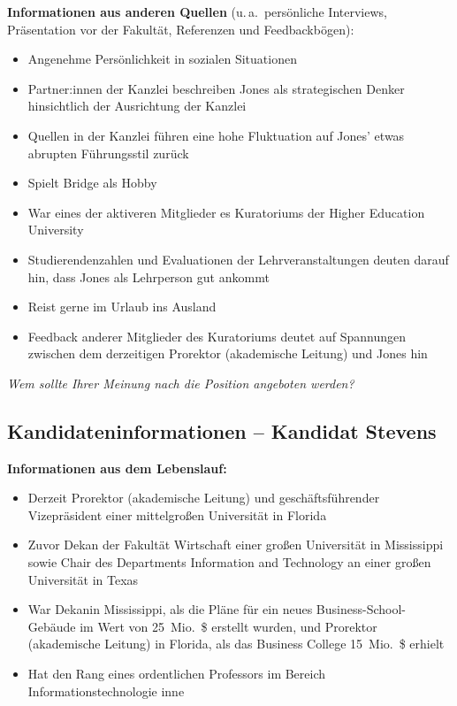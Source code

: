 \textbf{Informationen aus anderen Quellen}
(u.\,a.\ persönliche Interviews, Präsentation vor der Fakultät, Referenzen und Feedbackbögen):
\begin{itemize}
  \item Angenehme Persönlichkeit in sozialen Situationen
  \item Partner:innen der Kanzlei beschreiben Jones als strategischen Denker hinsichtlich der Ausrichtung
    der Kanzlei
  \item Quellen in der Kanzlei führen eine hohe Fluktuation auf Jones' etwas abrupten Führungsstil zurück
  \item Spielt Bridge als Hobby
  \item War eines der aktiveren Mitglieder es Kuratoriums der Higher Education
    University
  \item Studierendenzahlen und Evaluationen der Lehrveranstaltungen deuten darauf hin, dass Jones als
    Lehrperson gut ankommt
  \item Reist gerne im Urlaub ins Ausland
  \item Feedback anderer Mitglieder des Kuratoriums deutet auf Spannungen zwischen dem derzeitigen Prorektor
    (akademische Leitung) und Jones hin
\end{itemize}

\vspace{1em}
\noindent\textit{Wem sollte Ihrer Meinung nach die Position angeboten werden?}
\underline{\hspace{6cm}}

\clearpage
\subsection*{Kandidateninformationen -- Kandidat Stevens}
\thispagestyle{empty}

\textbf{Informationen aus dem Lebenslauf:}
\begin{itemize}
  \item Derzeit Prorektor (akademische Leitung) und geschäftsführender Vizepräsident einer mittelgroßen
    Universität in Florida
  \item Zuvor Dekan der Fakultät Wirtschaft einer großen Universität in Mississippi sowie Chair des Departments
    Information and Technology an einer großen Universität in Texas
  \item War Dekanin Mississippi, als die Pläne für ein neues Business-School-Gebäude im Wert von
    25~Mio.\ \$ erstellt wurden, und Prorektor (akademische Leitung) in Florida, als das Business College
    15~Mio.\ \$ erhielt
  \item Hat den Rang eines ordentlichen Professors im Bereich Informationstechnologie inne
\end{itemize}

